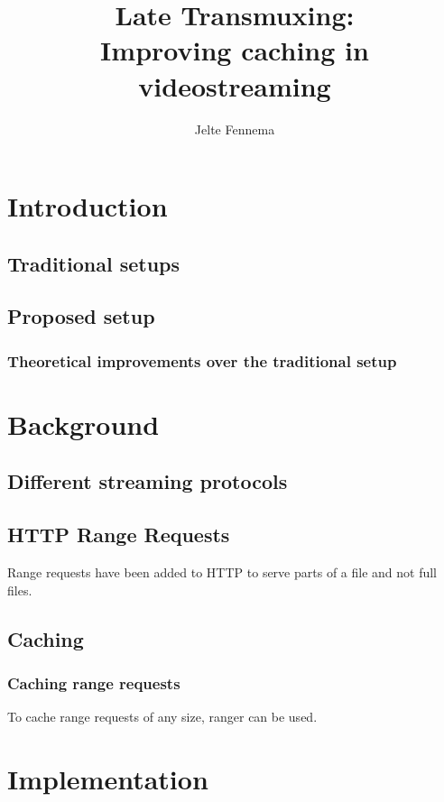 \documentclass[twoside,openright]{uva-bachelor-thesis}
\title{Late Transmuxing:\\Improving caching in videostreaming}
\author{Jelte Fennema}
\begin{document}
\maketitle

\begin{abstract}
\end{abstract}


\tableofcontents

\chapter{Introduction}
\section{Traditional setups}
\section{Proposed setup}
\subsection{Theoretical improvements over the traditional setup}

\chapter{Background}
\section{Different streaming protocols}
\section{HTTP Range Requests}
Range requests have been added to HTTP to serve parts of a file and not full
files.~\autocite{rangerequests}
\section{Caching}
\subsection{Caching range requests}
To cache range requests of any size, ranger \autocite{ranger} can be used.



\chapter{Implementation}
\end{document}

